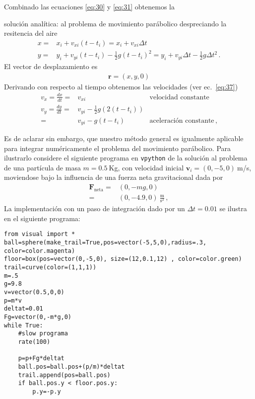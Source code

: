 Combinado las ecuaciones \eqref{eq:30} y \eqref{eq:31} obtenemos la
\begin{frame}
  \begin{block}%
{solución analítica:} al problema de movimiento parábolico despreciando la resitencia del aire
\begin{align}
  \label{eq:32}
  x=&x_i+v_{xi}(t-t_i)=x_i+v_{xi}\Delta t\nonumber\\
  y=&y_i+v_{yi}(t-t_i)-\frac{1}{2}g(t-t_i)^2=y_i+v_{yi}\Delta t-\frac{1}{2}g\Delta t^2\,.
\end{align}
El vector de desplazamiento es
\begin{align}
\mathbf{r}=(x,y,0)
\end{align}
Derivando con respecto al tiempo obtenemos las velocidades (ver ec.~\eqref{eq:37})
\begin{align}
  \label{eq:33}
  v_x=\frac{dx}{dt}=&v_{xi}&\text{velocidad constante}\nonumber\\
  v_y=\frac{dy}{dt}=&v_{yi}-\frac{1}{2}g(2(t-t_i))&\nonumber\\
  =&v_{yi}-g(t-t_i)&\text{aceleración constante}\,,
\end{align}

  \end{block}
\end{frame}

Es de aclarar sin embargo, que nuestro método general es igualmente aplicable para integrar numéricamente el problema del movimiento parábolico. Para ilustrarlo considere el siguiente programa en \texttt{vpython} de la solución al problema de una partícula de masa $m=0.5\ $Kg, con velocidad inicial $\mathbf{v}_i=(0,-5,0)\ $m/s, moviendose bajo la influencia de una fuerza neta gravitacional dada por
\begin{align}
\textbf{F}_{\text{neta}}=&(0,-mg,0)\nonumber\\
=&(0,-4.9,0)\ \frac{\text{m}}{\text{s}^2}\,,
\end{align}
La implementación con un paso de integración dado por un $\Delta t=0.01$ se ilustra en el siguiente programa:


\begin{frame}
\begin{lstlisting}
from visual import *
ball=sphere(make_trail=True,pos=vector(-5,5,0),radius=.3, color=color.magenta)
floor=box(pos=vector(0,-5,0), size=(12,0.1,12) , color=color.green)
trail=curve(color=(1,1,1))
m=.5
g=9.8
v=vector(0.5,0,0)
p=m*v
deltat=0.01
Fg=vector(0,-m*g,0)
while True:
    #slow programa
    rate(100)
    
    p=p+Fg*deltat
    ball.pos=ball.pos+(p/m)*deltat
    trail.append(pos=ball.pos)
    if ball.pos.y < floor.pos.y:
        p.y=-p.y

\end{lstlisting}
\end{frame}

